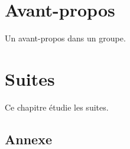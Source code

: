 \documentclass{ocots-book}
\begin{document}
{\pagestyle{empty}
\chapter*{Avant-propos}
Un avant-propos dans un groupe.
}
\chapter{Suites}
\minitoc

\begin{chapterintro}
  Ce chapitre étudie les suites.
\end{chapterintro}

\begin{appendix}
\chapter{Annexe}
\end{appendix}
\end{document}
